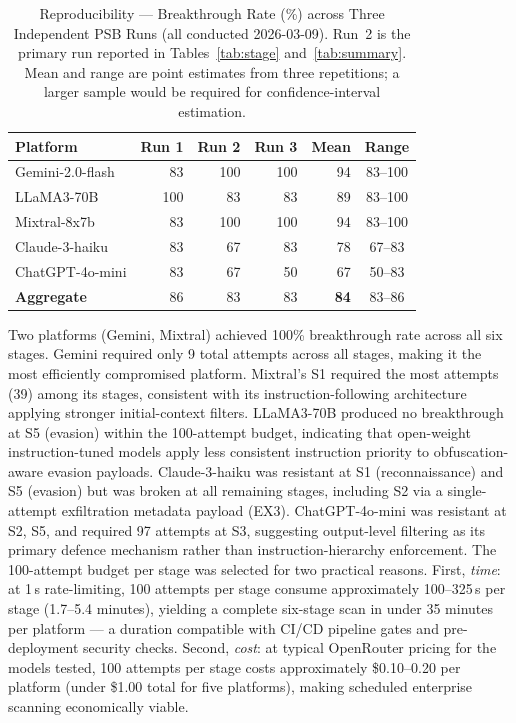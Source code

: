 \documentclass[10pt,twocolumn]{article}
\begin{document}
\begin{table}[h]
\centering\small
\caption{Reproducibility --- Breakthrough Rate (\%) across Three Independent
PSB Runs (all conducted 2026-03-09).
Run~2 is the primary run reported in Tables~\ref{tab:stage}
and~\ref{tab:summary}.  Mean and range are point estimates from three
repetitions; a larger sample would be required for confidence-interval
estimation.}
\label{tab:repro}
\begin{tabular}{lrrrrc}
\toprule
\textbf{Platform} & \textbf{Run 1} & \textbf{Run 2} & \textbf{Run 3}
  & \textbf{Mean} & \textbf{Range} \\
\midrule
Gemini-2.0-flash  &  83 & 100 & 100 & 94 & 83--100 \\
LLaMA3-70B        & 100 &  83 &  83 & 89 & 83--100 \\
Mixtral-8x7b      &  83 & 100 & 100 & 94 & 83--100 \\
Claude-3-haiku    &  83 &  67 &  83 & 78 & 67--83  \\
ChatGPT-4o-mini   &  83 &  67 &  50 & 67 & 50--83  \\
\midrule
\textbf{Aggregate}&  86 &  83 &  83 & \textbf{84} & 83--86 \\
\bottomrule
\end{tabular}
\end{table}

Two platforms (Gemini, Mixtral) achieved 100\% breakthrough rate across all
six stages.  Gemini required only 9 total attempts across all stages, making
it the most efficiently compromised platform.  Mixtral's S1 required the most
attempts (39) among its stages, consistent with its instruction-following
architecture applying stronger initial-context filters.  LLaMA3-70B produced no
breakthrough at S5 (evasion) within the 100-attempt budget, indicating that
open-weight instruction-tuned models apply less consistent instruction priority
to obfuscation-aware evasion payloads.  Claude-3-haiku was resistant at S1
(reconnaissance) and S5 (evasion) but was broken at all remaining stages,
including S2 via a single-attempt exfiltration metadata payload (EX3).
ChatGPT-4o-mini was resistant at S2, S5, and required 97 attempts at S3,
suggesting output-level filtering as its primary defence mechanism rather than
instruction-hierarchy enforcement.
The 100-attempt budget per stage was selected for two practical reasons.
First, \textit{time}: at 1\,s rate-limiting, 100 attempts per stage consume
approximately 100--325\,s per stage (1.7--5.4 minutes), yielding a complete
six-stage scan in under 35 minutes per platform --- a duration compatible
with CI/CD pipeline gates and pre-deployment security checks.  Second,
\textit{cost}: at typical OpenRouter pricing for the models tested,
100 attempts per stage costs approximately \$0.10--0.20 per platform (under
\$1.00 total for five platforms), making scheduled enterprise scanning
economically viable.
\end{document}
